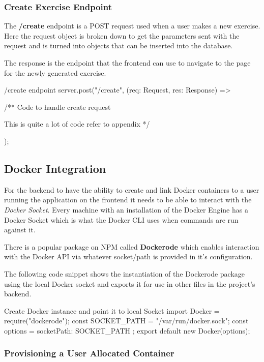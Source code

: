 \subsubsection{Create Exercise Endpoint}

The \textbf{/create} endpoint is a POST request used when a user makes a new exercise. Here the request object is broken down to get the parameters sent with the request and is turned into objects that can be inserted into the database.

The response is the endpoint that the frontend can use to navigate to the page for the newly generated exercise.

\begin{sexylisting}{/create endpoint}
server.post("/create", (req: Request, res: Response) => {
    /**
        Code to handle create request

        This is quite a lot of code refer to appendix %
    */
});
\end{sexylisting}

\subsection{Docker Integration}

For the backend to have the ability to create and link Docker containers to a user running the application on the frontend it needs to be able to interact with the \textit{Docker Socket}. Every machine with an installation of the Docker Engine has a Docker Socket which is what the Docker CLI uses when commands are run against it.

There is a popular package on NPM called \textbf{Dockerode} \cite{dockerode} which enables interaction with the Docker API via whatever socket/path is provided in it's configuration.

The following code snippet shows the instantiation of the Dockerode package using the local Docker socket and exports it for use in other files in the project's backend.

\begin{sexylisting}{Create Docker instance and point it to local Socket}    
import Docker = require("dockerode");
const SOCKET_PATH = "/var/run/docker.sock";
const options = { socketPath: SOCKET_PATH };
export default new Docker(options);
\end{sexylisting}

\subsubsection{Provisioning a User Allocated Container}

